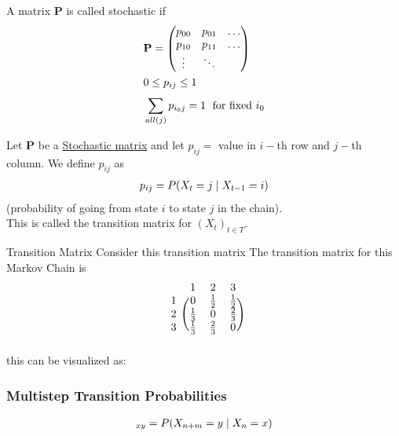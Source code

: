 \documentclass[12pt,a4paper]{article}
\begin{document}
\begin{defn}
    \label{stocmat}

    A matrix $\mathbf{P}$ is called stochastic if
    \begin{align*}
        &\mathbf{P} = \mqty(
        p_{00} & p_{01} & \ldots \\
        p_{10} & p_{11} & \ldots \\
        \vdots  & \ddots &
        )\\
        &0\leq p_{ij} \leq 1\\
        &\nsum{all(j)}{} p_{i_0j} = 1 \; \text{ for fixed $i_0$}
    \end{align*}
\end{defn}
\begin{defn}
    Let $\mathbf{P}$ be a \hyperref[stocmat]{Stochastic matrix} and let $p_{ij} = $ value in $i-$th row and $j-$th column.
    We define $p_{ij}$ as
    \begin{align*}
        &p_{ij} = P(X_{t} = j \;\vert\; X_{t-1} = i)\\
    \end{align*}
    (probability of going from state $i$ to state $j$ in the chain). \\
    This is called the transition matrix for $(X_t)_{t \in T}$.
\end{defn}
\newpage
\begin{example}{Transition Matrix}
    Consider this transition matrix 
    The transition matrix for this Markov Chain is
    \[
        \begin{blockarray}{cccc}
            & 1 & 2 & 3 \\
            \begin{block}{c(ccc)}
                1 & 0 & \frac{1}{2} & \frac{1}{2} \\
                2 & \frac{1}{3} & 0 & \frac{2}{3} \\
                3 & \frac{1}{3} & \frac{2}{3} & 0 \\
            \end{block}
        \end{blockarray}
    \]
    this can be visualized as: 
\end{example}
\newpage
\subsubsection{Multistep Transition Probabilities}
\begin{defn}
    \begin{align*}
        [P(n, n+m)]_{xy} = P(X_{n+m} = y \given X_{n} = x)
    \end{align*}
\end{defn}
\end{document}
